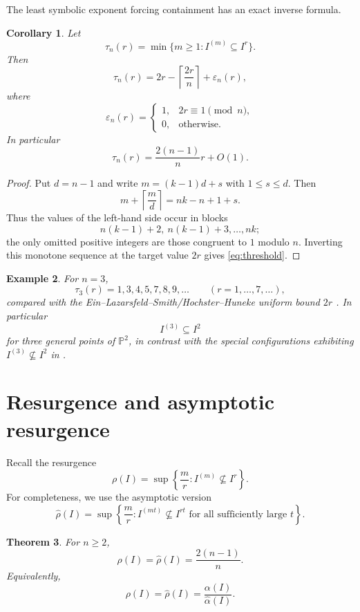 \documentclass[11pt]{article}
\newtheorem{theorem}{Theorem}[section]
\newtheorem{corollary}[theorem]{Corollary}
\newtheorem{example}[theorem]{Example}
\newcommand{\PP}{\mathbb P}
\newcommand{\Res}{\rho}
\newcommand{\aRes}{\widehat{\rho}}
\newcommand{\walpha}{\widehat{\alpha}}
\begin{document}
The least symbolic exponent forcing containment has an exact inverse
formula.

\begin{corollary}\label{cor:threshold}
Let
\[
 \tau_n(r)=\min\{m\ge1:I^{(m)}\subseteq I^r\}.
\]
Then
\begin{equation}\label{eq:threshold}
 \boxed{
 \tau_n(r)
 =
 2r-\left\lceil\frac{2r}{n}\right\rceil
 +\varepsilon_n(r),
 }
\end{equation}
where
\[
 \varepsilon_n(r)=
 \begin{cases}
 1,&2r\equiv1\pmod n,\\
 0,&\text{otherwise}.
 \end{cases}
\]
In particular
\[
 \tau_n(r)=\frac{2(n-1)}{n}r+O(1).
\]
\end{corollary}

\begin{proof}
Put \(d=n-1\) and write \(m=(k-1)d+s\) with
\(1\le s\le d\).  Then
\[
 m+\left\lceil\frac md\right\rceil
 =nk-n+1+s.
\]
Thus the values of the left-hand side occur in blocks
\[
 n(k-1)+2,\ n(k-1)+3,\ldots,nk;
\]
the only omitted positive integers are those congruent to \(1\)
modulo \(n\).  Inverting this monotone sequence at the target value
\(2r\) gives \eqref{eq:threshold}.
\end{proof}

\begin{example}
For \(n=3\),
\[
 \tau_3(r)=1,3,4,5,7,8,9,\ldots
 \qquad(r=1,\ldots,7,\ldots),
\]
compared with the Ein--Lazarsfeld--Smith/Hochster--Huneke uniform
bound \(2r\) \cite{ELS01,HH02}.  In particular
\[
 I^{(3)}\subseteq I^2
\]
for three general points of \(\PP^2\), in contrast with the special
configurations exhibiting \(I^{(3)}\not\subseteq I^2\) in
\cite{DSTG13}.
\end{example}

\section{Resurgence and asymptotic resurgence}

Recall the resurgence
\[
 \Res(I)=
 \sup\left\{\frac mr:I^{(m)}\not\subseteq I^r\right\}.
\]
For completeness, we use the asymptotic version
\[
 \aRes(I)=
 \sup\left\{
 \frac mr:
 I^{(mt)}\not\subseteq I^{rt}
 \text{ for all sufficiently large }t
 \right\}.
\]

\begin{theorem}\label{thm:resurgence}
For \(n\ge2\),
\[
 \boxed{
 \Res(I)=\aRes(I)=\frac{2(n-1)}{n}.
 }
\]
Equivalently,
\[
 \Res(I)=\aRes(I)=\frac{\alpha(I)}{\walpha(I)}.
\]
\end{theorem}
\end{document}
